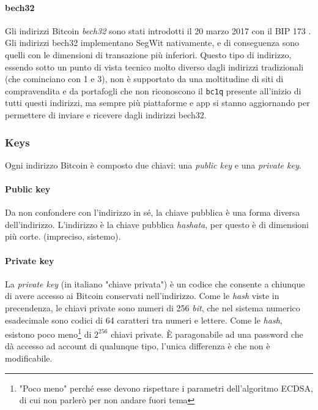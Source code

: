 \documentclass {article}
\begin{document}
\paragraph {bech32}

Gli indirizzi Bitcoin \textit{bech32} sono stati introdotti il 20 marzo 2017 con il BIP 173 \cite{bip173}.
Gli indirizzi bech32 implementano SegWit nativamente, e di conseguenza sono quelli con le dimensioni di transazione più inferiori.
Questo tipo di indirizzo, essendo sotto un punto di vista tecnico molto diverso dagli indirizzi tradizionali (che cominciano con 1 e 3), non è supportato da una moltitudine di siti di compravendita e da portafogli che non riconoscono il \texttt{bc1q} presente all'inizio di tutti questi indirizzi, ma sempre più piattaforme e app si stanno aggiornando per permettere di inviare e ricevere dagli indirizzi bech32.


\subsubsection {Keys}


Ogni indirizzo Bitcoin è composto due chiavi: una \textit{public key} e una \textit{private key}.


\paragraph {Public key}

Da non confondere con l'indirizzo in sé, la chiave pubblica è una forma diversa dell'indirizzo.
L'indirizzo è la chiave pubblica \textit{hashata}, per questo è di dimensioni più corte. (impreciso, sistemo).

\paragraph {Private key}

La \textit{private key} (in italiano "chiave privata") è un codice che consente a chiunque di avere accesso ai Bitcoin conservati nell'indirizzo.
Come le \textit{hash} viste in precendenza, le chiavi private sono numeri di 256 \textit{bit}, che nel sistema numerico esadecimale sono codici di 64 caratteri tra numeri e lettere.
Come le \textit{hash}, esistono poco meno\footnote{"Poco meno" perché esse devono rispettare i parametri dell'algoritmo ECDSA, di cui non parlerò per non andare fuori tema} di $2^{256}$ chiavi private.
È paragonabile ad una password che dà accesso ad account di qualunque tipo, l'unica differenza è che non è modificabile.
\end{document}
